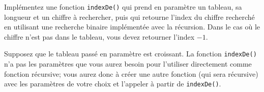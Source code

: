 \documentclass[11pt,addpoints]{exam}
\begin{document}
\begin{questions}
Implémentez une fonction \texttt{indexDe()} qui prend en paramètre un tableau,
sa longueur et un chiffre à rechercher, puis qui retourne l'index du chiffre
recherché en utilisant une recherche binaire implémentée avec la récursion.
Dans le cas où le chiffre n'est pas dans le tableau, vous devez retourner
l'index $-1$.

Supposez que le tableau passé en paramètre est croissant. La fonction
\texttt{indexDe()} n'a pas les paramètres que vous aurez besoin pour l'utiliser
directement comme fonction récursive; vous aurez donc à créer
une autre fonction (qui sera récursive) avec les paramètres de votre choix et
l'appeler à partir de \texttt{indexDe()}.

% 
% 
% 
% 
% 
% 
% 
% 
% 

\end{questions}
\end{document}
